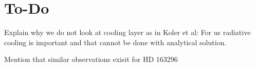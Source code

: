 \section{To-Do}
Explain why we do not look at cooling layer as in Koler et al: For us radiative cooling is important and that cannot be done with analytical solution.

Mention that similar observations exisit for HD 163296
